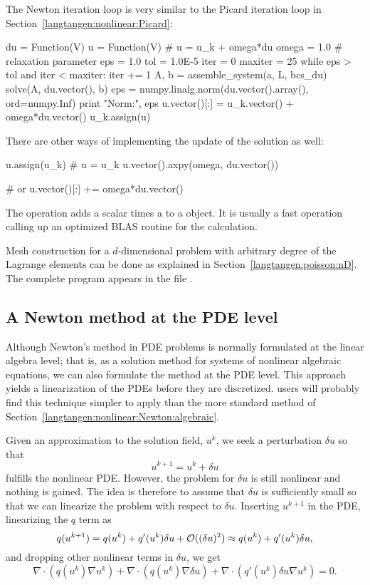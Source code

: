 \clearpage

The Newton iteration loop is very similar to the Picard iteration loop
in Section~\ref{langtangen:nonlinear:Picard}:
\begin{python}
du = Function(V)
u  = Function(V)  # u = u_k + omega*du
omega = 1.0       # relaxation parameter
eps = 1.0
tol = 1.0E-5
iter = 0
maxiter = 25
while eps > tol and iter < maxiter:
    iter += 1
    A, b = assemble_system(a, L, bcs_du)
    solve(A, du.vector(), b)
    eps = numpy.linalg.norm(du.vector().array(), ord=numpy.Inf)
    print "Norm:", eps
    u.vector()[:] = u_k.vector() + omega*du.vector()
    u_k.assign(u)
\end{python}
There are other ways of implementing the
update of the solution as well:
\begin{python}
u.assign(u_k)  # u = u_k
u.vector().axpy(omega, du.vector())

# or
u.vector()[:] += omega*du.vector()
\end{python}
The  operation adds a scalar  times a
  to a  object.  It is usually a fast
operation calling up an optimized BLAS routine for the calculation.

Mesh construction for a $d$-dimensional problem with arbitrary degree
of the Lagrange elements can be done as explained in
Section~\ref{langtangen:poisson:nD}.  The complete program appears in
the file .

\subsection{A Newton method at the PDE level}
\label{langtangen:nonlinear:Newton:pdelevel}
\label{Newton's method}

Although Newton's method in PDE problems is normally formulated at the
linear algebra level; that is, as a solution method for systems of nonlinear
algebraic equations, we can also formulate the method at the PDE level.
This approach yields a linearization of the PDEs before they are discretized.
\fenics{} users will probably find this technique simpler to apply than
the more standard method of Section~\ref{langtangen:nonlinear:Newton:algebraic}.

Given an approximation to the solution field, $u^k$, we seek a
perturbation $\delta u$ so that
\begin{equation}
u^{k+1} = u^k + \delta u
\end{equation}
fulfills the nonlinear PDE.
However, the problem for $\delta u$ is still nonlinear and nothing is
gained. The idea is therefore to assume that $\delta u$ is sufficiently
small so that we can linearize the problem with respect to $\delta u$.
Inserting $u^{k+1}$ in the PDE,
linearizing the $q$ term as
\begin{equation}
q(u^{k+1}) = q(u^k) + q'(u^k)\delta u + {\cal O}((\delta u)^2)
\approx q(u^k) + q'(u^k)\delta u,
\end{equation}
and dropping other nonlinear terms in $\delta u$,
we get
\[
\nabla\cdot\left( q(u^k)\nabla u^k\right) +
\nabla\cdot\left( q(u^k)\nabla\delta u\right) +
\nabla\cdot\left( q'(u^k)\delta u\nabla u^k\right) = 0.
\]

